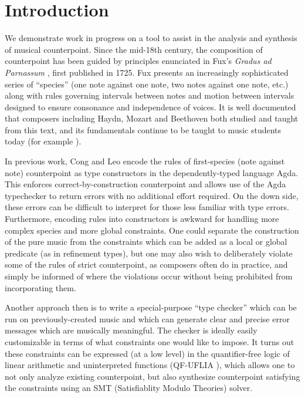 \documentclass[sigplan,screen]{acmart}
\begin{document}
\section{Introduction}

We demonstrate work in progress on a tool to assist in the analysis and
synthesis of musical counterpoint. Since the mid-18th century, the
composition of counterpoint has been guided by principles enunciated
in Fux's \textit{Gradus ad Parnassum} \citep{Fux1965}, first published
in 1725. Fux presents an increasingly sophisticated series of
``species'' (one note against one note, two notes against one note,
etc.) along with rules governing intervals between notes and motion
between intervals designed to ensure consonance and independence of
voices. It is well documented \citep{Mann1987} that composers
including Haydn, Mozart and Beethoven both studied and taught from
this text, and its fundamentals continue to be taught to music students
today (for example \cite{Kennan1999, Aldwell2018}).

In previous work, Cong and Leo \citep{CongLeo2019} encode the rules of
first-species (note against note) counterpoint as type constructors in
the dependently-typed language Agda. This enforces
correct-by-construction counterpoint and allows use of the Agda
typechecker to return errors with no additional effort required. On
the down side, these errors can be difficult to interpret for those
less familiar with type errors. Furthermore, encoding rules into
constructors is awkward for handling more complex species and more
global constraints. One could separate the construction of the pure
music from the constraints which can be added as a local or global
predicate (as in refinement types), but one may also wish to
deliberately violate some of the rules of strict counterpoint, as
composers often do in practice, and simply be informed of where the
violations occur without being prohibited from incorporating them.

Another approach then is to write a special-purpose ``type checker''
which can be run on previously-created music and which can generate
clear and precise error messages which are musically meaningful. The
checker is ideally easily customizable in terms of what constraints
one would like to impose. It turns out these constraints can be
expressed (at a low level) in the quantifier-free logic of linear
arithmetic and uninterpreted functions (QF-UFLIA \cite{Barrett2010}),
which allows one to not only analyze existing counterpoint, but also
synthesize counterpoint satisfying the constraints using an SMT
(Satisfiablity Modulo Theories) solver.
\end{document}
